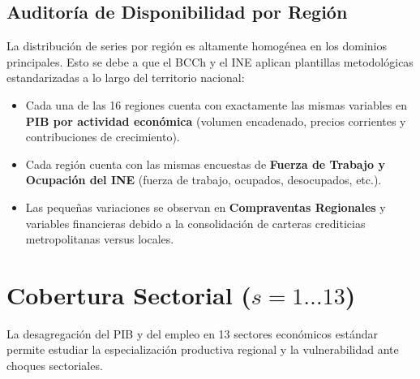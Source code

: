 \documentclass[11pt,a4paper]{article}
\begin{document}
\subsection{Auditoría de Disponibilidad por Región}
La distribución de series por región es altamente homogénea en los dominios principales. Esto se debe a que el BCCh y el INE aplican plantillas metodológicas estandarizadas a lo largo del territorio nacional:
\begin{itemize}
  \item Cada una de las 16 regiones cuenta con exactamente las mismas variables en \textbf{PIB por actividad económica} (volumen encadenado, precios corrientes y contribuciones de crecimiento).
  \item Cada región cuenta con las mismas encuestas de \textbf{Fuerza de Trabajo y Ocupación del INE} (fuerza de trabajo, ocupados, desocupados, etc.).
  \item Las pequeñas variaciones se observan en \textbf{Compraventas Regionales} y variables financieras debido a la consolidación de carteras crediticias metropolitanas versus locales.

\end{itemize}

\strut


\section{Cobertura Sectorial ($s = 1 \dots 13$)}

La desagregación del PIB y del empleo en 13 sectores económicos estándar permite estudiar la especialización productiva regional y la vulnerabilidad ante choques sectoriales.
\end{document}
